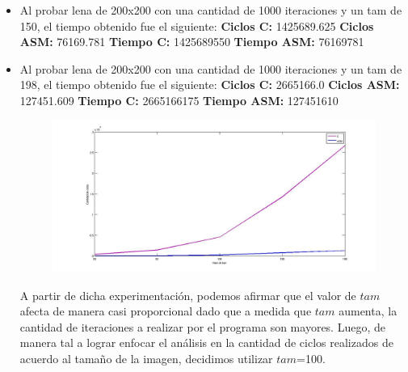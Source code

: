 \documentclass[10pt, a4paper]{article}
\begin{document}
\begin{itemize}
\begin{itemize}
\item{Al probar lena de 200x200 con una cantidad de 1000 iteraciones y un tam de 150, el tiempo obtenido fue el siguiente:\newline
\newline
\textbf{Ciclos C:}                 1425689.625\newline
\vspace{0.15cm}
\textbf{Ciclos ASM:}               76169.781\newline
\textbf{Tiempo C:}                 1425689550\newline
\textbf{Tiempo ASM:}               76169781\newline}

\item{Al probar lena de 200x200 con una cantidad de 1000 iteraciones y un tam de 198, el tiempo obtenido fue el siguiente:\newline
\newline
\textbf{Ciclos C:}                 2665166.0\newline
\vspace{0.15cm}
\textbf{Ciclos ASM:}               127451.609\newline
\textbf{Tiempo C:}                 2665166175\newline
\textbf{Tiempo ASM:}               127451610\newline}


\begin{figure}[H] %
\begin{center}
\includegraphics[width=560pt]{./variacionTam.jpg}
\end{center}
\end{figure}

A partir de dicha experimentación, podemos afirmar que el valor de $tam$ afecta de manera casi proporcional dado que a medida que $tam$ aumenta, la cantidad de iteraciones a realizar por el programa son mayores. Luego, de manera tal a lograr enfocar el análisis en la cantidad de ciclos realizados de acuerdo al tamaño de la imagen, decidimos utilizar $tam$=100.\newline 


\end{itemize}
\end{itemize}
\end{document}
